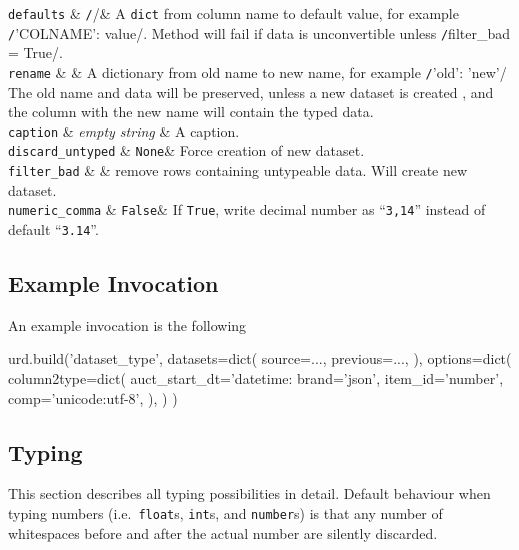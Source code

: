   \RP \texttt{defaults} & \texttt/{}/& A \texttt{dict} from
  column name to default value, for example
  \texttt/{'COLNAME': value}/.  Method will fail if data
  is unconvertible unless \texttt/filter_bad = True/.\\[1ex]

  \RP \texttt{rename} & & A dictionary from old name to new name, for
  example \texttt/{'old': 'new'}/ The old name and data
  will be preserved, unless a new dataset is created ,
  and the column with the new name will contain the typed
  data. \\[1ex]

  \RP \texttt{caption} & \textsl{empty string} & A caption.\\[4ex]

  \RP \texttt{discard\_untyped} & \texttt{None}& Force creation of new dataset.\\[1ex]

  \RP \texttt{filter\_bad} & \pyFalse &  remove rows containing untypeable data.  Will create new dataset.\\[1ex]

  \RP \texttt{numeric\_comma} & \texttt{False}& If
  \texttt{True}, write decimal number as ``\texttt{3,14}'' instead of
  default ``\texttt{3.14}''.\\[1ex]
\stoptable
  



\clearpage
\subsection{Example Invocation}
An example invocation is the following

\begin{python}
urd.build('dataset_type',
    datasets=dict(
        source=...,
        previous=...,
    ),
    options=dict(
        column2type=dict(
            auct_start_dt='datetime:%
            brand='json',
            item_id='number',
            comp='unicode:utf-8',
        ),
    )
)
\end{python}



\subsection{Typing}
This section describes all typing possibilities in detail.  Default
behaviour when typing numbers (i.e.\ \texttt{float}s, \texttt{int}s,
and \texttt{number}s) is that any number of whitespaces before and
after the actual number are silently discarded.



